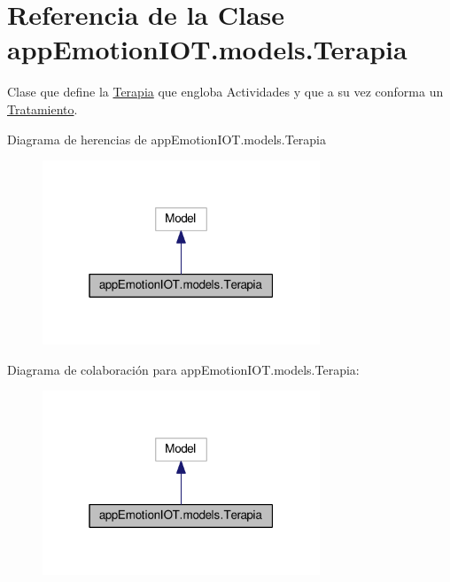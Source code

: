 \hypertarget{classappEmotionIOT_1_1models_1_1Terapia}{}\section{Referencia de la Clase app\+Emotion\+I\+O\+T.\+models.\+Terapia}
\label{classappEmotionIOT_1_1models_1_1Terapia}


Clase que define la \hyperlink{classappEmotionIOT_1_1models_1_1Terapia}{Terapia} que engloba Actividades y que a su vez conforma un \hyperlink{classappEmotionIOT_1_1models_1_1Tratamiento}{Tratamiento}.  




Diagrama de herencias de app\+Emotion\+I\+O\+T.\+models.\+Terapia
\nopagebreak
\begin{figure}[H]
\begin{center}
\leavevmode
\includegraphics[width=235pt]{classappEmotionIOT_1_1models_1_1Terapia__inherit__graph}
\end{center}
\end{figure}


Diagrama de colaboración para app\+Emotion\+I\+O\+T.\+models.\+Terapia\+:
\nopagebreak
\begin{figure}[H]
\begin{center}
\leavevmode
\includegraphics[width=235pt]{classappEmotionIOT_1_1models_1_1Terapia__coll__graph}
\end{center}
\end{figure}
